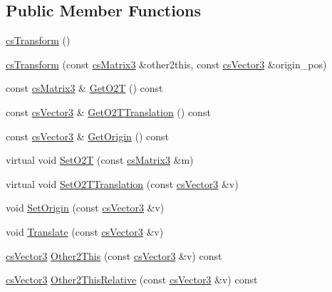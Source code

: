 \subsection*{Public Member Functions}
\begin{DoxyCompactItemize}
\item 
\hyperlink{classcsTransform_a1b862dc9f2a33edd0db4814b71c26860}{cs\+Transform} ()
\item 
\hyperlink{classcsTransform_a5e0ff99eda1b2e313b62cdfae53df4af}{cs\+Transform} (const \hyperlink{classcsMatrix3}{cs\+Matrix3} \&other2this, const \hyperlink{classcsVector3}{cs\+Vector3} \&origin\+\_\+pos)
\item 
const \hyperlink{classcsMatrix3}{cs\+Matrix3} \& \hyperlink{classcsTransform_a6b9dc087bd425a9bc8fe1c35a127e7b3}{Get\+O2T} () const 
\item 
const \hyperlink{classcsVector3}{cs\+Vector3} \& \hyperlink{classcsTransform_addaca558caeb0026f10074a43192a6b3}{Get\+O2\+T\+Translation} () const 
\item 
const \hyperlink{classcsVector3}{cs\+Vector3} \& \hyperlink{classcsTransform_a913ab986883038d0a450f07448d47c7d}{Get\+Origin} () const 
\item 
virtual void \hyperlink{classcsTransform_a8982b8df6c6260a98fbf9ac18ec0a681}{Set\+O2T} (const \hyperlink{classcsMatrix3}{cs\+Matrix3} \&m)
\item 
virtual void \hyperlink{classcsTransform_a1630a99216c2b2a39116f4c42ffbf649}{Set\+O2\+T\+Translation} (const \hyperlink{classcsVector3}{cs\+Vector3} \&v)
\item 
void \hyperlink{classcsTransform_a5a12e267771bda04fee9a37c7d13d016}{Set\+Origin} (const \hyperlink{classcsVector3}{cs\+Vector3} \&v)
\item 
void \hyperlink{classcsTransform_a23206c158aa7582116460d126a427df0}{Translate} (const \hyperlink{classcsVector3}{cs\+Vector3} \&v)
\item 
\hyperlink{classcsVector3}{cs\+Vector3} \hyperlink{classcsTransform_a463655d40948540a2a5b2a867d5ba03c}{Other2\+This} (const \hyperlink{classcsVector3}{cs\+Vector3} \&v) const 
\item 
\hyperlink{classcsVector3}{cs\+Vector3} \hyperlink{classcsTransform_a7a1a4a71f1a2406bca35ac678d53f92e}{Other2\+This\+Relative} (const \hyperlink{classcsVector3}{cs\+Vector3} \&v) const 
\end{DoxyCompactItemize}
